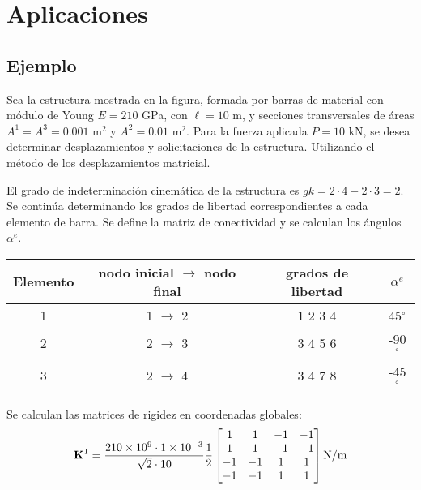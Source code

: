 \section{Aplicaciones}

\subsection{Ejemplo} \label{sec:ejemplobarra}

Sea la estructura mostrada en la figura, formada por barras de material con módulo de Young $E=210 $ GPa, con $\ell= 10$ m, y secciones transversales  de áreas $A^1 = A^3 = 0.001$ m$^2$ y $A^2 = 0.01 $ m$^2$. %
%
Para la fuerza aplicada $P= 10 $ kN, se desea determinar desplazamientos y solicitaciones de la estructura. Utilizando el método de los desplazamientos matricial.

	\begin{center}
   \def\svgwidth{0.6\textwidth}
   
	\end{center}


El grado de indeterminación cinemática de la estructura es $gk = 2 \cdot 4 - 2 \cdot 3 = 2$. %
%
Se continúa determinando los grados de libertad correspondientes a cada elemento de barra. Se define la matriz de conectividad y se calculan los ángulos $\alpha^e$.
%
\begin{center}
\begin{tabular}{cccc}
  \hline
  Elemento & nodo inicial $\rightarrow$ nodo final & grados de libertad & $\alpha^e$\\
  \hline
	1 & 1 $\rightarrow$ 2 & 1 2 3 4 & 45$^\circ$\\
	2 & 2 $\rightarrow$ 3 & 3 4 5 6 & -90$^\circ$\\
	3 & 2 $\rightarrow$ 4 & 3 4 7 8 & -45$^\circ$\\
  \hline
\end{tabular}
\end{center}

Se calculan las matrices de rigidez en coordenadas globales:
\begin{equation}
{\bf K}^1 = \frac{ 210 \times10^9 \cdot 1 \times 10^{-3} }{ \sqrt{2}  \cdot 10} \frac{1}{2}
\left[
\begin{matrix}
1 & 1 & -1 & -1 \\
1 & 1 & -1 & -1\\
-1 & -1 &  1 & 1\\
-1 & -1 & 1 & 1
\end{matrix}
\right]
\text{N/m}
\end{equation}

